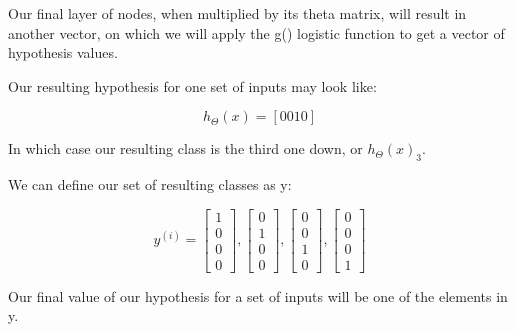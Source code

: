 Our final layer of nodes, when multiplied by its theta matrix, will result in another vector, on which we will apply the g() logistic function to get a vector of hypothesis values.

Our resulting hypothesis for one set of inputs may look like:

$$
h_\Theta(x) = [0010]
$$

In which case our resulting class is the third one down, or $h_\Theta(x)_3$.

We can define our set of resulting classes as y:

\begin{equation*}
y^{(i)}= 
\begin{bmatrix}1\\0\\0\\0 \end{bmatrix},
\begin{bmatrix}0\\1\\0\\0 \end{bmatrix},
\begin{bmatrix}0\\0\\1\\0 \end{bmatrix},
\begin{bmatrix}0\\0\\0\\1 \end{bmatrix}
\end{equation*}

Our final value of our hypothesis for a set of inputs will be one of the elements in y.

